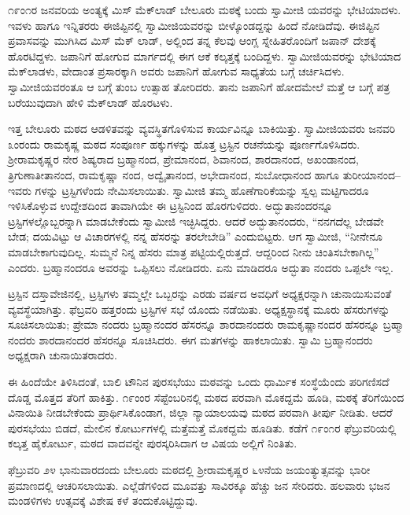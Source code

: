 ೧೯ಂ೧ರ ಜನವರಿಯ ಅಂತ್ಯಕ್ಕೆ ಮಿಸ್ ಮೆಕ್​ಲಾಡ್ ಬೇಲೂರು ಮಠಕ್ಕೆ ಬಂದು ಸ್ವಾಮೀಜಿ ಯವರನ್ನು ಭೇಟಿಯಾದಳು. ಇವಳು ಹಾಗೂ ಇನ್ನಿತರರು ಈಜಿಪ್ಟಿನಲ್ಲಿ ಸ್ವಾಮೀಜಿಯವರನ್ನು ಬೀಳ್ಕೊಂಡದ್ದನ್ನು ಹಿಂದೆ ನೋಡಿದೆವು. ಈಜಿಪ್ಟಿನ ಪ್ರವಾಸವನ್ನು ಮುಗಿಸಿದ ಮಿಸ್ ಮೆಕ್ ಲಾಡ್, ಅಲ್ಲಿಂದ ತನ್ನ ಕೆಲವು ಆಂಗ್ಲ ಸ್ನೇಹಿತರೊಂದಿಗೆ ಜಪಾನ್ ದೇಶಕ್ಕೆ ಹೊರಟಿದ್ದಳು. ಜಪಾನಿಗೆ ಹೋಗುವ ಮಾರ್ಗದಲ್ಲಿ ಈಗ ಆಕೆ ಕಲ್ಕತ್ತಕ್ಕೆ ಬಂದಿದ್ದಳು. ಸ್ವಾಮೀಜಿಯವರನ್ನು ಭೇಟಿಯಾದ ಮೆಕ್​ಲಾಡಳು, ವೇದಾಂತ ಪ್ರಸಾರಕ್ಕಾಗಿ ಅವರು ಜಪಾನಿಗೆ ಹೋಗುವ ಸಾಧ್ಯತೆಯ ಬಗ್ಗೆ ಚರ್ಚಿಸಿದಳು. ಸ್ವಾಮೀಜಿಯವರಂತೂ ಆ ಬಗ್ಗೆ ತುಂಬ ಉತ್ಸಾಹ ತೋರಿದರು. ತಾನು ಜಪಾನಿಗೆ ಹೋದಮೇಲೆ ಮತ್ತೆ ಆ ಬಗ್ಗೆ ಪತ್ರ ಬರೆಯುವುದಾಗಿ ಹೇಳಿ ಮೆಕ್​ಲಾಡ್ ಹೊರಟಳು.

ಇತ್ತ ಬೇಲೂರು ಮಠದ ಆಡಳಿತವನ್ನು ವ್ಯವಸ್ಥಿತಗೊಳಿಸುವ ಕಾರ್ಯವಿನ್ನೂ ಬಾಕಿಯಿತ್ತು. ಸ್ವಾಮೀಜಿಯವರು ಜನವರಿ ೩ಂರಂದು ರಾಮಕೃಷ್ಣ ಮಠದ ಸಂಪೂರ್ಣ ಹಕ್ಕುಗಳನ್ನು ಹೊತ್ತ ಟ್ರಸ್ಟಿನ ರಚನೆಯನ್ನು ಪೂರ್ಣಗೊಳಿಸಿದರು. ಶ್ರೀರಾಮಕೃಷ್ಣರ ನೇರ ಶಿಷ್ಯರಾದ ಬ್ರಹ್ಮಾನಂದ, ಪ್ರೇಮಾನಂದ, ಶಿವಾನಂದ, ಶಾರದಾನಂದ, ಅಖಂಡಾನಂದ, ತ್ರಿಗುಣಾತೀತಾನಂದ, ರಾಮಕೃಷ್ಣಾ ನಂದ, ಅದ್ವೈತಾನಂದ, ಅಭೇದಾನಂದ, ಸುಬೋಧಾನಂದ ಹಾಗೂ ತುರೀಯಾನಂದ–ಇವರು ಗಳನ್ನು ಟ್ರಸ್ಟಿಗಳೆಂದು ನೇಮಿಸಲಾಯಿತು. ಸ್ವಾಮೀಜಿ ತಮ್ಮ ಹೊಣೆಗಾರಿಕೆಯನ್ನು ಸ್ವಲ್ಪ ಮಟ್ಟಿಗಾದರೂ ಇಳಿಸಿಕೊಳ್ಳುವ ಉದ್ದೇಶದಿಂದ ತಾವಾಗಿಯೇ ಈ ಟ್ರಸ್ಟಿನಿಂದ ಹೊರಗುಳಿದರು. ಅದ್ಭುತಾನಂದರನ್ನೂ ಟ್ರಸ್ಟಿಗಳಲ್ಲೊಬ್ಬರನ್ನಾಗಿ ಮಾಡಬೇಕೆಂದು ಸ್ವಾಮೀಜಿ ಇಚ್ಛಿಸಿದ್ದರು. ಆದರೆ ಅದ್ಭುತಾನಂದರು, “ನನಗದೆಲ್ಲ ಬೇಡವೇ ಬೇಡ; ದಯವಿಟ್ಟು ಆ ವಿಚಾರಗಳಲ್ಲಿ ನನ್ನ ಹೆಸರನ್ನು ತರಲೇಬೇಡಿ” ಎಂದುಬಿಟ್ಟರು. ಆಗ ಸ್ವಾಮೀಜಿ, “ನೀನೇನೂ ಮಾಡಬೇಕಾಗುವುದಿಲ್ಲ. ಸುಮ್ಮನೆ ನಿನ್ನ ಹೆಸರು ಮಾತ್ರ ಪಟ್ಟಿಯಲ್ಲಿರುತ್ತದೆ. ಆದ್ದರಿಂದ ನೀನು ಚಿಂತಿಸಬೇಕಾಗಿಲ್ಲ” ಎಂದರು. ಬ್ರಹ್ಮಾನಂದರೂ ಅವರನ್ನು ಒಪ್ಪಿಸಲು ನೋಡಿದರು. ಏನು ಮಾಡಿದರೂ ಅದ್ಭುತಾ ನಂದರು ಒಪ್ಪಲೇ ಇಲ್ಲ.

ಟ್ರಸ್ಟಿನ ದಸ್ತಾವೇಜಿನಲ್ಲಿ, ಟ್ರಸ್ಟಿಗಳು ತಮ್ಮಲ್ಲೇ ಒಬ್ಬರನ್ನು ಎರಡು ವರ್ಷದ ಅವಧಿಗೆ ಅಧ್ಯಕ್ಷರನ್ನಾಗಿ ಚುನಾಯಿಸುವಂತೆ ವ್ಯವಸ್ಥೆಯಾಗಿತ್ತು. ಫೆಬ್ರವರಿ ಹತ್ತರಂದು ಟ್ರಸ್ಟಿಗಳ ಸಭೆ ಯೊಂದು ನಡೆಯಿತು. ಅಧ್ಯಕ್ಷಸ್ಥಾನಕ್ಕೆ ಮೂರು ಹೆಸರುಗಳನ್ನು ಸೂಚಿಸಲಾಯಿತು; ಪ್ರೇಮಾ ನಂದರು ಬ್ರಹ್ಮಾನಂದರ ಹೆಸರನ್ನೂ ಶಾರದಾನಂದರು ರಾಮಕೃಷ್ಣಾನಂದರ ಹೆಸರನ್ನೂ ಬ್ರಹ್ಮಾ ನಂದರು ಶಾರದಾನಂದರ ಹೆಸರನ್ನೂ ಸೂಚಿಸಿದರು. ಈಗ ಮತಗಳನ್ನು ಹಾಕಲಾಯಿತು. ಸ್ವಾಮಿ ಬ್ರಹ್ಮಾನಂದರು ಅಧ್ಯಕ್ಷರಾಗಿ ಚುನಾಯಿತರಾದರು.

ಈ ಹಿಂದೆಯೇ ತಿಳಿಸಿದಂತೆ, ಬಾಲಿ ಟೌನಿನ ಪುರಸಭೆಯು ಮಠವನ್ನು ಒಂದು ಧಾರ್ಮಿಕ ಸಂಸ್ಥೆಯೆಂದು ಪರಿಗಣಿಸದೆ ದೊಡ್ಡ ಮೊತ್ತದ ತೆರಿಗೆ ಹಾಕಿತ್ತು. ೧೯ಂಂರ ಸೆಪ್ಟೆಂಬರಿನಲ್ಲಿ ಮಠದ ಪರವಾಗಿ ಮೊಕದ್ದಮೆ ಹೂಡಿ, ಮಠಕ್ಕೆ ತೆರಿಗೆಯಿಂದ ವಿನಾಯಿತಿ ನೀಡಬೇಕೆಂದು ಪ್ರಾರ್ಥಿಸಿಕೊಂಡಾಗ, ಜಿಲ್ಲಾ ನ್ಯಾಯಾಲಯವು ಮಠದ ಪರವಾಗಿ ತೀರ್ಪು ನೀಡಿತು. ಆದರೆ ಪುರಸಭೆಯು ಬಿಡದೆ, ಮೇಲಿನ ಕೋರ್ಟುಗಳಲ್ಲಿ ಮತ್ತೆಮತ್ತೆ ಮೊಕದ್ದಮೆ ಹೂಡಿತು. ಕಡೆಗೆ ೧೯ಂ೧ರ ಫೆಬ್ರುವರಿಯಲ್ಲಿ ಕಲ್ಕತ್ತ ಹೈಕೋರ್ಟು, ಮಠದ ವಾದವನ್ನೇ ಪುರಸ್ಕರಿಸಿದಾಗ ಆ ವಿಷಯ ಅಲ್ಲಿಗೆ ನಿಂತಿತು.

ಫೆಬ್ರುವರಿ ೨೪ ಭಾನುವಾರದಂದು ಬೇಲೂರು ಮಠದಲ್ಲಿ ಶ್ರೀರಾಮಕೃಷ್ಣರ ೬೪ನೆಯ ಜಯಂತ್ಯುತ್ಸವನ್ನು ಭಾರೀ ಪ್ರಮಾಣದಲ್ಲಿ ಆಚರಿಸಲಾಯಿತು. ಎಲ್ಲೆಡೆಗಳಿಂದ ಮೂವತ್ತು ಸಾವಿರಕ್ಕೂ ಹೆಚ್ಚು ಜನ ಸೇರಿದರು. ಹಲವಾರು ಭಜನ ಮಂಡಳಿಗಳು ಉತ್ಸವಕ್ಕೆ ವಿಶೇಷ ಕಳೆ ತಂದುಕೊಟ್ಟಿದ್ದುವು.

